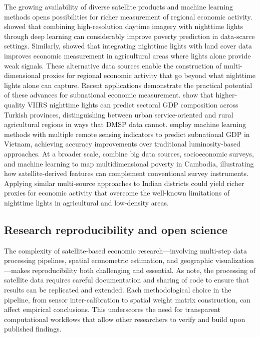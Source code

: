 \documentclass[
  a4paper, 
  twoside,
  review
]{article}
\newcounter{code}
\begin{document}
The growing availability of diverse satellite products and machine
learning methods opens possibilities for richer measurement of regional
economic activity. \citet{jean_etal_poverty_prediction} showed that
combining high-resolution daytime imagery with nighttime lights through
deep learning can considerably improve poverty prediction in data-scarce
settings. Similarly, \citet{keola_etal_lights_poverty} showed that
integrating nighttime lights with land cover data improves economic
measurement in agricultural areas where lights alone provide weak
signals. These alternative data sources enable the construction of
multi-dimensional proxies for regional economic activity that go beyond
what nighttime lights alone can capture. Recent applications demonstrate
the practical potential of these advances for subnational economic
measurement. \citet{chen_etal_turkey_viirs} show that higher-quality
VIIRS nighttime lights can predict sectoral GDP composition across
Turkish provinces, distinguishing between urban service-oriented and
rural agricultural regions in ways that DMSP data cannot.
\citet{hussein_etal_vietnam_ml} employ machine learning methods with
multiple remote sensing indicators to predict subnational GDP in
Vietnam, achieving accuracy improvements over traditional
luminosity-based approaches. At a broader scale,
\citet{theara_etal_cambodia_poverty} combine big data sources,
socioeconomic surveys, and machine learning to map multidimensional
poverty in Cambodia, illustrating how satellite-derived features can
complement conventional survey instruments. Applying similar
multi-source approaches to Indian districts could yield richer proxies
for economic activity that overcome the well-known limitations of
nighttime lights in agricultural and low-density areas.

\subsection{Research reproducibility and open
science}\label{research-reproducibility-and-open-science}

The complexity of satellite-based economic research---involving
multi-step data processing pipelines, spatial econometric estimation,
and geographic visualization---makes reproducibility both challenging
and essential. As \citet{donaldson_storeygard_remotesensing} note, the
processing of satellite data requires careful documentation and sharing
of code to ensure that results can be replicated and extended. Each
methodological choice in the pipeline, from sensor inter-calibration to
spatial weight matrix construction, can affect empirical conclusions.
This underscores the need for transparent computational workflows that
allow other researchers to verify and build upon published findings.
\end{document}
